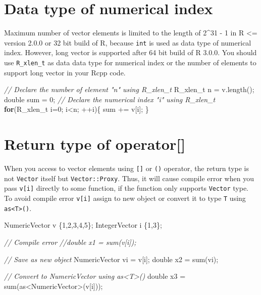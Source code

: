 \documentclass[
]{book}
\newenvironment{Shaded}{\begin{snugshade}}{\end{snugshade}}
\newcommand{\CommentTok}[1]{\textcolor[rgb]{0.56,0.35,0.01}{\textit{#1}}}
\newcommand{\ControlFlowTok}[1]{\textcolor[rgb]{0.13,0.29,0.53}{\textbf{#1}}}
\newcommand{\DataTypeTok}[1]{\textcolor[rgb]{0.13,0.29,0.53}{#1}}
\newcommand{\DecValTok}[1]{\textcolor[rgb]{0.00,0.00,0.81}{#1}}
\newcommand{\NormalTok}[1]{#1}
\begin{document}
\hypertarget{data-type-of-numerical-index}{%
\section{Data type of numerical index}\label{data-type-of-numerical-index}}

Maximum number of vector elements is limited to the length of 2\^{}31 - 1 in R \textless= version 2.0.0 or 32 bit build of R, because \texttt{int} is used as data type of numerical index. However, long vector is supported after 64 bit build of R 3.0.0. You should use \texttt{R\_xlen\_t} as data data type for numerical index or the number of elements to support long vector in your Rcpp code.

\begin{Shaded}
\begin{Highlighting}[]
\CommentTok{// Declare the number of element "n" using R_xlen_t}
\DataTypeTok{R_xlen_t}\NormalTok{ n = v.length();}
\DataTypeTok{double}\NormalTok{ sum = }\DecValTok{0}\NormalTok{;}
\CommentTok{// Declare the numerical index "i" using R_xlen_t}
\ControlFlowTok{for}\NormalTok{(}\DataTypeTok{R_xlen_t}\NormalTok{ i=}\DecValTok{0}\NormalTok{; i<n; ++i)\{}
\NormalTok{  sum += v[i];}
\NormalTok{\}}
\end{Highlighting}
\end{Shaded}

\hypertarget{return-type-of-operator}{%
\section{Return type of operator{[}{]}}\label{return-type-of-operator}}

When you access to vector elements using \texttt{{[}{]}} or \texttt{()} operator, the return type is not \texttt{Vector} itself but \texttt{Vector::Proxy}. Thus, it will cause compile error when you pass \texttt{v{[}i{]}} directly to some function, if the function only supports \texttt{Vector} type. To avoid compile error \texttt{v{[}i{]}} assign to new object or convert it to type \texttt{T} using \texttt{as\textless{}T\textgreater{}()}.

\begin{Shaded}
\begin{Highlighting}[]
\NormalTok{NumericVector v \{}\DecValTok{1}\NormalTok{,}\DecValTok{2}\NormalTok{,}\DecValTok{3}\NormalTok{,}\DecValTok{4}\NormalTok{,}\DecValTok{5}\NormalTok{\};}
\NormalTok{IntegerVector i \{}\DecValTok{1}\NormalTok{,}\DecValTok{3}\NormalTok{\};}

\CommentTok{// Compile error}
\CommentTok{//double x1 = sum(v[i]);}

\CommentTok{// Save as new object}
\NormalTok{NumericVector vi = v[i];}
\DataTypeTok{double}\NormalTok{   x2 = sum(vi);}

\CommentTok{// Convert to NumericVector using as<T>()}
\DataTypeTok{double}\NormalTok{   x3 = sum(as<NumericVector>(v[i]));}
\end{Highlighting}
\end{Shaded}
\end{document}
